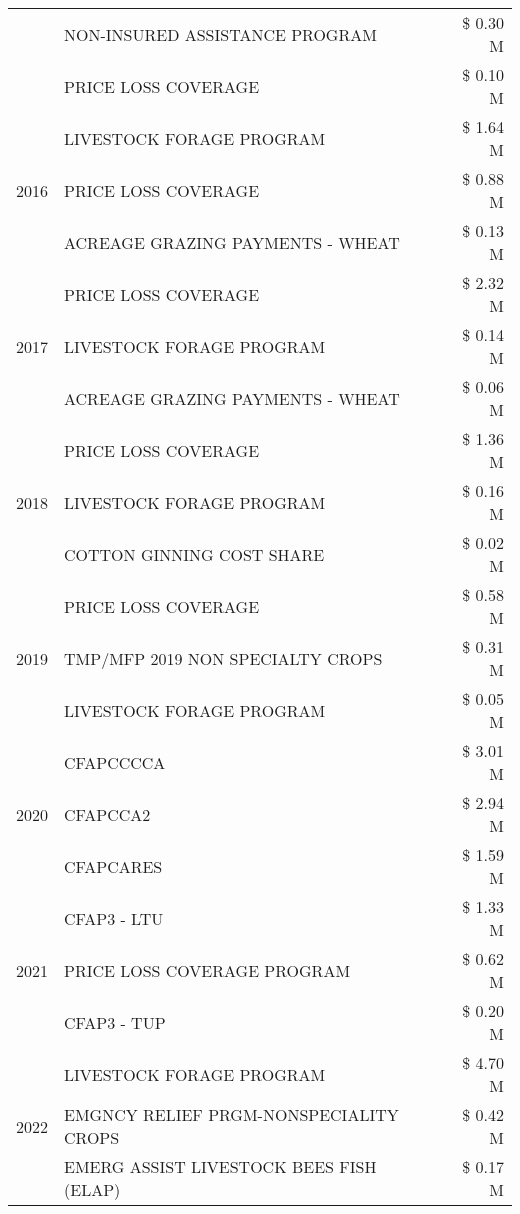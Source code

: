 \begin{tabular}{llr}
 & NON-INSURED ASSISTANCE PROGRAM & \$ 0.30 M \\
 & PRICE LOSS COVERAGE & \$ 0.10 M \\
\cline{1-3}
\multirow[t]{3}{*}{2016} & LIVESTOCK FORAGE PROGRAM & \$ 1.64 M \\
 & PRICE LOSS COVERAGE & \$ 0.88 M \\
 & ACREAGE GRAZING PAYMENTS - WHEAT & \$ 0.13 M \\
\cline{1-3}
\multirow[t]{3}{*}{2017} & PRICE LOSS COVERAGE & \$ 2.32 M \\
 & LIVESTOCK FORAGE PROGRAM & \$ 0.14 M \\
 & ACREAGE GRAZING PAYMENTS - WHEAT & \$ 0.06 M \\
\cline{1-3}
\multirow[t]{3}{*}{2018} & PRICE LOSS COVERAGE & \$ 1.36 M \\
 & LIVESTOCK FORAGE PROGRAM & \$ 0.16 M \\
 & COTTON GINNING COST SHARE & \$ 0.02 M \\
\cline{1-3}
\multirow[t]{3}{*}{2019} & PRICE LOSS COVERAGE & \$ 0.58 M \\
 & TMP/MFP 2019 NON SPECIALTY CROPS & \$ 0.31 M \\
 & LIVESTOCK FORAGE PROGRAM & \$ 0.05 M \\
\cline{1-3}
\multirow[t]{3}{*}{2020} & CFAPCCCCA & \$ 3.01 M \\
 & CFAPCCA2 & \$ 2.94 M \\
 & CFAPCARES & \$ 1.59 M \\
\cline{1-3}
\multirow[t]{3}{*}{2021} & CFAP3 - LTU & \$ 1.33 M \\
 & PRICE LOSS COVERAGE PROGRAM & \$ 0.62 M \\
 & CFAP3 - TUP & \$ 0.20 M \\
\cline{1-3}
\multirow[t]{3}{*}{2022} & LIVESTOCK FORAGE PROGRAM & \$ 4.70 M \\
 & EMGNCY RELIEF PRGM-NONSPECIALITY CROPS & \$ 0.42 M \\
 & EMERG ASSIST LIVESTOCK BEES FISH (ELAP) & \$ 0.17 M \\
\cline{1-3}
\bottomrule
\end{tabular}
